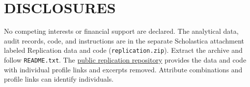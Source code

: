 \documentclass[11pt]{article}
\begin{document}
\section*{DISCLOSURES}
No competing interests or financial support are declared. The analytical data, audit records, code, and instructions are in the separate Scholastica attachment labeled Replication data and code (\texttt{replication.zip}). Extract the archive and follow \texttt{README.txt}. The \href{https://github.com/werdnabae/transportation-faculty-doctoral-cohorts}{public replication repository} provides the data and code with individual profile links and excerpts removed. Attribute combinations and profile links can identify individuals.

\end{document}
